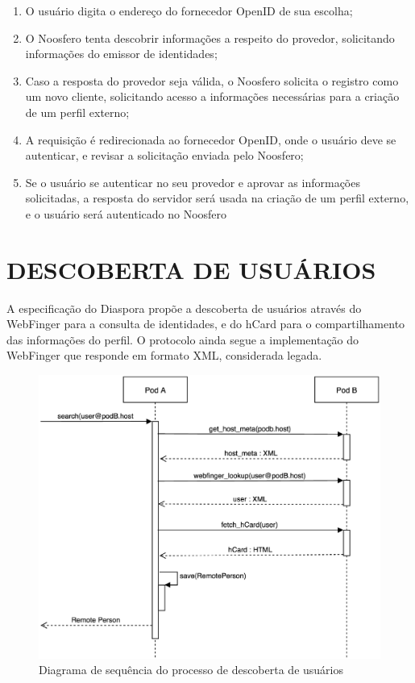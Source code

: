 \begin{enumerate}
  \item{O usuário digita o endereço do fornecedor OpenID de sua escolha;}
  \item{O Noosfero tenta descobrir informações a respeito do provedor, solicitando
        informações do emissor de identidades;}
  \item{Caso a resposta do provedor seja válida, o Noosfero solicita o registro como
        um novo cliente, solicitando acesso a informações necessárias para a criação
        de um perfil externo;}
  \item{A requisição é redirecionada ao fornecedor OpenID, onde o usuário deve se
        autenticar, e revisar a solicitação enviada pelo Noosfero;}
  \item{Se o usuário se autenticar no seu provedor e aprovar as informações
        solicitadas, a resposta do servidor será usada na criação de um perfil
        externo, e o usuário será autenticado no Noosfero}
\end{enumerate}



\section{DESCOBERTA DE USUÁRIOS}

A especificação do Diaspora propõe a descoberta de usuários através do WebFinger
para a consulta de identidades, e do hCard para o compartilhamento das informações
do perfil. O protocolo ainda segue a implementação do WebFinger que responde em
formato XML, considerada legada.

\begin{figure}[h]
	\centering
		\includegraphics[keepaspectratio=true,scale=0.5]{figuras/seq_descoberta.eps}
	\caption{Diagrama de sequência do processo de descoberta de usuários}
	\label{fig:seq_descoberta}
\end{figure}

